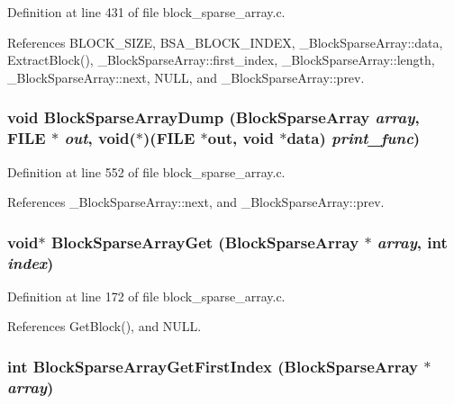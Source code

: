 Definition at line 431 of file block\_\-sparse\_\-array.c.

References BLOCK\_\-SIZE, BSA\_\-BLOCK\_\-INDEX, \_\-Block\-Sparse\-Array::data, Extract\-Block(), \_\-Block\-Sparse\-Array::first\_\-index, \_\-Block\-Sparse\-Array::length, \_\-Block\-Sparse\-Array::next, NULL, and \_\-Block\-Sparse\-Array::prev.
\subsubsection{\setlength{\rightskip}{0pt plus 5cm}void Block\-Sparse\-Array\-Dump (\bf{Block\-Sparse\-Array} {\em array}, FILE $\ast$ {\em out}, void($\ast$)(FILE $\ast$out, void $\ast$data) {\em print\_\-func})}\label{block__sparse__array_8h_235c49b2a1c0bba47b344568ed490866}




Definition at line 552 of file block\_\-sparse\_\-array.c.

References \_\-Block\-Sparse\-Array::next, and \_\-Block\-Sparse\-Array::prev.
\subsubsection{\setlength{\rightskip}{0pt plus 5cm}void$\ast$ Block\-Sparse\-Array\-Get (\bf{Block\-Sparse\-Array} $\ast$ {\em array}, int {\em index})}\label{block__sparse__array_8h_1c50d98a3304ccd73b83a89417606ca5}




Definition at line 172 of file block\_\-sparse\_\-array.c.

References Get\-Block(), and NULL.
\subsubsection{\setlength{\rightskip}{0pt plus 5cm}int Block\-Sparse\-Array\-Get\-First\-Index (\bf{Block\-Sparse\-Array} $\ast$ {\em array})}\label{block__sparse__array_8h_6adb292385a6ca7a1e64b7bd9d196597}




